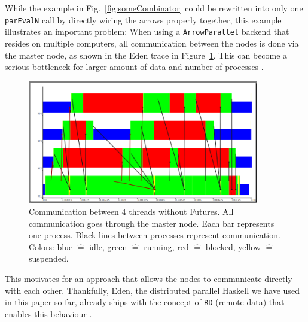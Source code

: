 \documentclass{jfp1}
\renewcommand{\cite}[1]{\citep{#1}}
\newcommand{\inlinecode}[1]{\texttt{#1}}
\DeclareRobustCommand{\hairspn}{\hspace{1pt}\nolinebreak}%
\DeclareRobustCommand{\eg}{{e.\hairspn{}g.~}}
\begin{document}
While the example in Fig.~\ref{fig:someCombinator} could be rewritten into only one \inlinecode{parEvalN} call by directly wiring the arrows properly together, this example illustrates an important problem: When using a \inlinecode{ArrowParallel} backend that resides on multiple computers, all communication between the nodes is done via the master node, as shown in the Eden trace in Figure~\ref{fig:withoutFutures}. This can become a serious bottleneck %
for larger amount of data and number of processes \citep[showcases][as, \eg]{Berthold2009-fft}.
\begin{figure}[ht]
	\centering
	\includegraphics[width=0.9\textwidth]{images/withoutFutures}
	\caption[without Futures]{Communication between 4 threads without Futures. All communication goes through the master node. Each bar represents one process. Black lines between processes represent communication. Colors: blue $\hat{=}$ idle, green $\hat{=}$ running, red  $\hat{=}$ blocked, yellow $\hat{=}$ suspended.}
	\label{fig:withoutFutures}
\end{figure}

This motivates for an approach that allows the nodes to communicate directly with each other. Thankfully, Eden, the distributed parallel Haskell we have used in this paper so far, already ships with the concept of \inlinecode{RD} (remote data) that enables this behaviour \cite{AlGo03a,Dieterle2010}.
\end{document}
